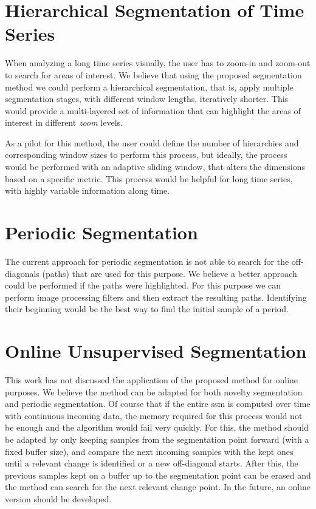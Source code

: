 \section{Hierarchical Segmentation of Time Series}

When analyzing a long time series visually, the user has to zoom-in and zoom-out to search for areas of interest. We believe that using the proposed segmentation method we could perform a hierarchical segmentation, that is, apply multiple segmentation stages, with different window lengths, iteratively shorter. This would provide a multi-layered set of information that can highlight the areas of interest  in different \textit{zoom} levels.
\par
As a pilot for this method, the user could define the number of hierarchies  and corresponding window sizes to perform this process, but ideally, the process would be performed with an adaptive sliding window, that alters the dimensions based on a specific metric. This process would be helpful for long time series, with highly variable information along time.

\section{Periodic Segmentation}

The current approach for periodic segmentation is not able to search for the off-diagonals (paths) that are used for this purpose. We believe a better approach could be performed if the paths were highlighted. For this purpose we can perform image processing filters and then extract the resulting paths. Identifying their beginning would be the best way to find the initial sample of a period. 

\section{Online Unsupervised Segmentation}

This work has not discussed the application of the proposed method for online purposes. We believe the method can be adapted for both novelty segmentation and periodic segmentation. Of course that if the entire \gls{ssm} is computed over time with continuous incoming data, the memory required for this process would not be enough and the algorithm would fail very quickly. For this, the method should be adapted by only keeping samples from the segmentation point forward (with a fixed buffer size), and compare the next incoming samples with the kept ones until a relevant change is identified or a new off-diagonal starts. After this, the previous samples kept on a buffer up to the segmentation point can be erased and the method can search for the next relevant change point. In the future, an online version should be developed.


